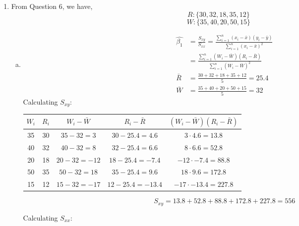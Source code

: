 \documentclass[12pt]{article}
\begin{document}
\begin{enumerate}[1.]
\begin{enumerate}[(a)]
        \end{enumerate}
        \item 
        From Question 6, we have, \
        \[R : \{ 30, 32, 18, 35, 12 \} \]
        \[W : \{ 35, 40, 20, 50, 15 \} \]
        \begin{enumerate}[(a)]
            \item 
            \begin{align*}
                \hat{\beta_1} &= \frac{S_{xy}}{S_{xx}} = \frac{\sum_{i=1}^{n} (x_i - \bar{x})(y_i - \bar{y})}{\sum_{i=1}^{n} (x_i - \bar{x})^2} \\
                &= \frac{\sum_{i=1}^{n} (W_i - \bar{W})(R_i - \bar{R})}{\sum_{i=1}^{n} (W_i - \bar{W})^2} \\
                \bar{R} &= \frac{30 + 32 + 18 + 35 + 12}{5} = 25.4 \\
                \bar{W} &= \frac{35 + 40 + 20 + 50 + 15}{5} = 32
            \end{align*}
            Calculating $S_{xy}$:
            \begin{center}
                \begin{tabular}{|c|c|c|c|c|}
                    \hline
                    $W_i$ & $R_i$ & $W_i - \bar{W}$ & $R_i - \bar{R}$ & $(W_i - \bar{W})(R_i - \bar{R})$\\
                    \hline
                    35 & 30 & $35 - 32 = 3$ & $30 - 25.4 = 4.6$ & $3 \cdot 4.6 = 13.8$ \\
                    \hline
                    40 & 32 & $40 - 32 = 8$ & $32 - 25.4 = 6.6$ & $8 \cdot 6.6 = 52.8$ \\
                    \hline
                    20 & 18 & $20 - 32 = -12$ & $18 - 25.4 = -7.4$ & $-12 \cdot -7.4 = 88.8$ \\
                    \hline
                    50 & 35 & $50 - 32 = 18$ & $35 - 25.4 = 9.6$ & $18 \cdot 9.6 = 172.8$ \\
                    \hline
                    15 & 12 & $15 - 32 = -17$ & $12 - 25.4 = -13.4$ & $-17 \cdot -13.4 = 227.8$ \\
                    \hline
                \end{tabular}
                \[ S_{xy} = 13.8 + 52.8 + 88.8 + 172.8 + 227.8 = 556 \]
            \end{center}
            Calculating $S_{xx}$:
            \begin{center} 
                \begin{tabular}{|c|c|c|c|}
                    \hline

\end{tabular}
\end{center}
\end{enumerate}
\end{enumerate}
\end{document}
